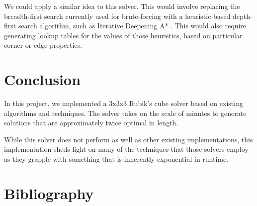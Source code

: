 \documentclass{article}
\begin{document}
We could apply a similar idea to this solver. This would involve replacing the breadth-first search currently used for brute-forcing with a heuristic-based depth-first search algorithm, such as Iterative Deepening A* \cite{ida}. This would also require generating lookup tables for the values of those heuristics, based on particular corner or edge properties.

\section{Conclusion}
In this project, we implemented a 3x3x3 Rubik's cube solver based on existing algorithms and techniques. The solver takes on the scale of minutes to generate solutions that are approximately twice optimal in length.

While this solver does not perform as well as other existing implementations, this implementation sheds light on many of the techniques that those solvers employ as they grapple with something that is inherently exponential in runtime.

\section{Bibliography}
\printbibliography[heading=none]


\end{document}
